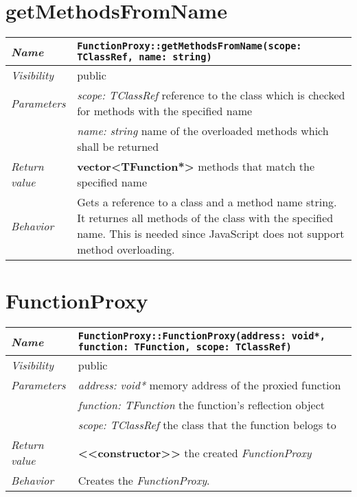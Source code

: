 \section{getMethodsFromName}
\begin{longtable}{p{3cm} @{\hskip 1cm} p{12cm}}
	\hline

	\textit{Name} & \texttt{FunctionProxy::getMethodsFromName(scope: TClassRef, name: string)}\\
	\hline

	\textit{Visibility} & public\\
	\hline

	\textit{Parameters} & \textit{scope: TClassRef} reference to the class which is checked for methods with the specified name\\
		& \textit{name: string} name of the overloaded methods which shall be returned\\
	\hline

	\textit{Return value} & \textbf{vector<TFunction*>} methods that match the specified name\\
	\hline

	\textit{Behavior} & Gets a reference to a class and a method name string. It returnes all methods of the class with the specified name. This is needed since JavaScript does not support method overloading.\\
	\hline

\end{longtable}
\pagebreak

\section{FunctionProxy}
\begin{longtable}{p{3cm} @{\hskip 1cm} p{12cm}}
	\hline

	\textit{Name} & \texttt{FunctionProxy::FunctionProxy(address: void*, function: TFunction, scope: TClassRef)}\\
	\hline

	\textit{Visibility} & public\\
	\hline

	\textit{Parameters} & \textit{address: void*} memory address of the proxied function\\
		& \textit{function: TFunction} the function's reflection object\\
		& \textit{scope: TClassRef} the class that the function belogs to\\
	\hline

	\textit{Return value} & \textbf{<<constructor>>} the created \textit{FunctionProxy}\\
	\hline

	\textit{Behavior} & Creates the \textit{FunctionProxy}.\\
	\hline

\end{longtable}


